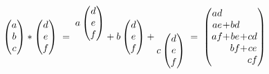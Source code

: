 \documentclass[12pt]{article}
\begin{document}
\begin{align*}
	\begin{pmatrix}a\\b\\c\end{pmatrix}
	 *
	\begin{pmatrix}d\\e\\f\end{pmatrix}
	 \; = \;
	\raisebox{5mm }{$a\begin{pmatrix}d\\e\\f\end{pmatrix}$} +
	\raisebox{0mm }{$b\begin{pmatrix}d\\e\\f\end{pmatrix}$} +
	\raisebox{-5mm}{$c\begin{pmatrix}d\\e\\f\end{pmatrix}$}
	 \; = \;
	\left(\begin{array}{@{}c@{}c@{}c@{}c@{}c@{}}
	     ad&&&&\\ae&+&bd&&\\af&+&be&+&cd\\&&bf&+&ce\\&&&&cf
	\end{array}\right)%
\end{align*}
\end{document}
